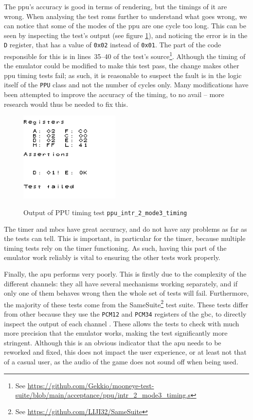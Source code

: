 \documentclass[11pt]{informatics-report}
\newcommand{\ftnt}[1]{\footnote{See \url{#1}}}
\begin{document}
The \gls{ppu}'s accuracy is good in terms of rendering, but the timings of it are wrong. When analysing the test \glspl{rom} further to understand what goes wrong, we can notice that some of the modes of the \gls{ppu} are one cycle too long. This can be seen by inspecting the test's output (see figure \ref{fig:failed-ppu-timing-test}), and noticing the error is in the \texttt{D} register, that has a value of \texttt{0x02} instead of \texttt{0x01}. The part of the code responsible for this is in lines~35--40 of the test's source\ftnt{https://github.com/Gekkio/mooneye-test-suite/blob/main/acceptance/ppu/intr\_2\_mode3\_timing.s}. Although the timing of the emulator could be modified to make this test pass, the change makes other \gls{ppu} timing tests fail; as such, it is reasonable to suspect the fault is in the logic itself of the \texttt{PPU} class and not the number of cycles only. Many modifications have been attempted to improve the accuracy of the timing, to no avail -- more research would thus be needed to fix this.

\begin{figure}[h]
    \centering
    \includegraphics[width=5cm]{images/failed-ppu-timing-test}\\
    \caption{Output of PPU timing test \texttt{ppu\_intr\_2\_mode3\_timing}}
    \label{fig:failed-ppu-timing-test}
\end{figure}

The timer and \glspl{mbc} have great accuracy, and do not have any problems as far as the tests can tell. This is important, in particular for the timer, because multiple timing tests rely on the timer functioning. As such, having this part of the emulator work reliably is vital to ensuring the other tests work properly.

Finally, the \gls{apu} performs very poorly. This is firstly due to the complexity of the different channels: they all have several mechanisms working separately, and if only one of them behaves wrong then the whole set of tests will fail. Furthermore, the majority of these tests come from the SameSuite\ftnt{https://github.com/LIJI32/SameSuite} test suite. These tests differ from other because they use the \texttt{PCM12} and \texttt{PCM34} registers of the \gls{gbc}, to directly inspect the output of each channel \cite[Audio Details]{pandoc}. These allows the tests to check with much more precision that the emulator works, making the test significantly more stringent. Although this is an obvious indicator that the \gls{apu} needs to be reworked and fixed, this does not impact the user experience, or at least not that of a casual user, as the audio of the game does not sound off when being used.
\end{document}
